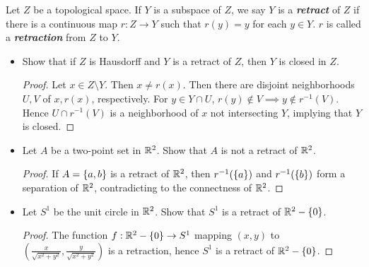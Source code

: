 \documentclass[12pt,a4paper]{article}
\begin{document}
    \begin{ex}
        Let $Z$ be a topological space. If $Y$ is a subspace of $Z$, we say $Y$ is a \textbf{\textit{retract}} of $Z$ if there is a continuous map $r:Z\to Y$ such that $r(y)=y$ for each $y\in Y$. $r$ is called a \textbf{\textit{retraction}} from $Z$ to $Y$.
        \begin{itemize}
            \item Show that if $Z$ is Hausdorff and $Y$ is a retract of $Z$, then $Y$ is closed in $Z$.
            \begin{proof}
                Let $x\in Z\setminus Y$. Then $x\neq r(x)$. Then there are disjoint neighborhoods $U,V$ of $x,r(x)$, respectively. For $y\in Y\cap U$, $r(y)\notin V\implies y\notin r^{-1}(V)$. Hence $U\cap r^{-1}(V)$ is a neighborhood of $x$ not intersecting $Y$, implying that $Y$ is closed.
            \end{proof}
            \item Let $A$ be a two-point set in $\mathbb{R}^2$. Show that $A$ is not a retract of $\mathbb{R}^2$.
            \begin{proof}
                If $A=\left\{a,b\right\}$ is a retract of $\mathbb{R}^2$, then $r^{-1}(\left\{a\right\})$ and $r^{-1}(\left\{b\right\})$ form a separation of $\mathbb{R}^2$, contradicting to the connectness of $\mathbb{R}^2$.
            \end{proof}
            \item Let $S^1$ be the unit circle in $\mathbb{R}^2$. Show that $S^1$ is a retract of $\mathbb{R}^2-\left\{0\right\}$.
            \begin{proof}
                The function $f:\mathbb{R}^2-\left\{0\right\}\to S^1$ mapping $(x,y)$ to $(\frac{x}{\sqrt{x^2+y^2}},\frac{y}{\sqrt{x^2+y^2}})$ is a retraction, hence $S^1$ is a retract of $\mathbb{R}^2-\left\{0\right\}$.
            \end{proof}
        \end{itemize}
    \end{ex}
    \hfill
\end{document}
